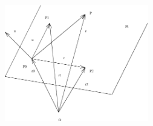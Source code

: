 \begin{frame}
\begin{columns}
  \column{5.5cm}
    \begin{figure}
        \includegraphics[height=2in]{../images/ok-plane_three_points.eps}
    \end{figure}
\end{columns}

\end{frame}

